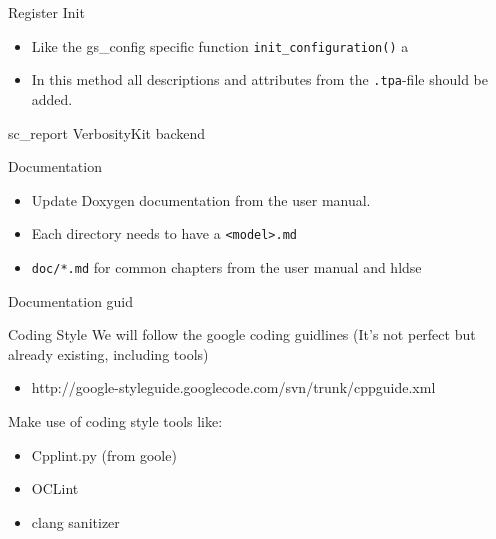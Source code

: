 \documentclass[fleqn,11pt,aspectratio=43]{beamer}
\begin{document}
\begin{frame}{Register Init}
  \begin{itemize}
    \item Like the gs\_config specific function {\tt init\_configuration()} a 
    \item In this method all descriptions and attributes from the {\tt .tpa}-file should be added.
  \end{itemize}
\end{frame}

\begin{frame}{sc\_report VerbosityKit backend }
\end{frame}

\begin{frame}{Documentation}
\begin{itemize}
    \item Update Doxygen documentation from the user manual.
    \item Each directory needs to have a {\tt <model>.md}
    \item {\tt doc/*.md} for common chapters from the user manual and hldse
\end{itemize}
\end{frame}

\begin{frame}{Documentation guid}
\end{frame}

\begin{frame}{Coding Style}
We will follow the google coding guidlines
(It's not perfect but already existing, including tools)
\begin{itemize}
  \item http://google-styleguide.googlecode.com/svn/trunk/cppguide.xml
\end{itemize}
Make use of coding style tools like:
\begin{itemize}
  \item Cpplint.py (from goole)
  \item OCLint
  \item clang sanitizer
\end{itemize}
\end{frame}
\end{document}

